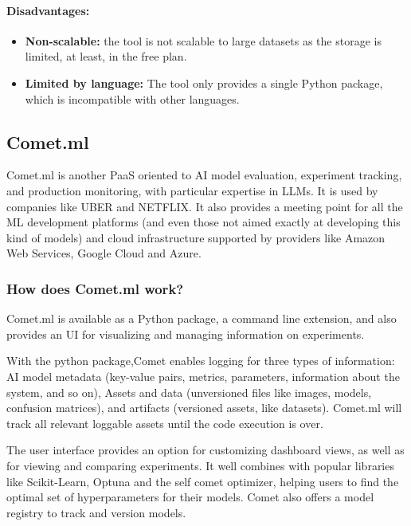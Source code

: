 \paragraph{Disadvantages:}

\begin{itemize}
    \item \textbf{Non-scalable: }the tool is not scalable to large datasets as the storage is limited, at least, in the free plan.
    \item \textbf{Limited by language: }The tool only provides a single Python package, which is incompatible with other languages.
\end{itemize}

\subsection{Comet.ml}

Comet.ml is another \acrshort{PaaS} oriented to \acrshort{AI} model evaluation, experiment tracking, and production monitoring, with particular expertise in \acrfull{LLMs}.
It is used by companies like UBER and NETFLIX. It also provides a meeting point for all the \acrshort{ML} development platforms (and even those not aimed
exactly at developing this kind of models) and cloud infrastructure supported by providers like Amazon Web Services, Google Cloud and Azure.

\subsubsection{How does Comet.ml work?\cite{cometmldocs}}

Comet.ml is available as a Python package, a command line extension, and also provides an \acrshort{UI} for visualizing and managing information on experiments.

With the python package,Comet enables logging for three types of information: AI model metadata (key-value pairs, metrics, parameters, information about the system, 
and so on), Assets and data (unversioned files like images, models, confusion matrices), and artifacts (versioned assets, like datasets). Comet.ml will track all relevant
loggable assets until the code execution is over.

The user interface provides an option for customizing dashboard views, as well as for viewing and comparing experiments. It well combines with popular libraries like 
Scikit-Learn, Optuna and the self comet optimizer, helping users to find the optimal set of hyperparameters for their models. Comet also offers a model registry to 
track and version models.

